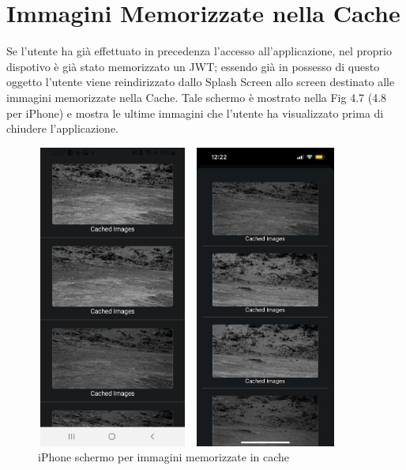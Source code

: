 \section{Immagini Memorizzate nella Cache}
Se l'utente ha gi\`a effettuato in precedenza l'accesso all'applicazione, nel proprio dispotivo \`e gi\`a stato memorizzato un JWT;
essendo gi\`a in possesso di questo oggetto l'utente viene reindirizzato dallo Splash Screen allo screen destinato alle immagini memorizzate nella Cache. Tale schermo \`e mostrato
nella Fig 4.7 (4.8 per iPhone) e mostra le ultime immagini che l'utente ha visualizzato prima di chiudere l'applicazione.
\begin{figure}[h]
    \begin{minipage}[h]{0.47\textwidth}
        \centering
        \includegraphics[width=5cm, height=10cm]{images/immaginiAndroid/imagesLoadin.jpg}
        \caption{\label{imagesLoadinAndroid} Android schermo per immagini memorizzate in cache}
    \end{minipage}
    \hfill
    \begin{minipage}[h]{0.47\textwidth}
        \centering
        \includegraphics[width=5cm, height=10cm]{images/immaginiPhone/imagesLoading.jpeg}
        \caption{\label{imagesLoadinIphone}iPhone schermo per immagini memorizzate in cache}
    \end{minipage}
\end{figure}

